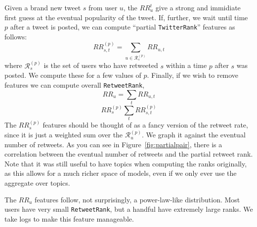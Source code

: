 Given a brand new tweet $s$ from user $u$, the $RR_u^t$ give a strong and immidiate first guess at the eventual popularity of the tweet.  If, further, we wait until time $p$ after a tweet is posted, we can compute ``partial \texttt{TwitterRank}'' features as follows:
\[RR_{s,t}^{(p)} = \sum_{u\in\mathcal{R}_s^{(p)}}RR_{u,t}\]
where $\mathcal{R}_s^{(p)}$ is the set of users who have retweeted $s$ within a time $p$ after $s$ was posted.  
We compute these for a few values of $p$.
Finally, if we wish to remove features we can compute overall \texttt{RetweetRank},
\[RR_{u} =\sum_t RR_{u,t}\]
\[RR_{s}^{(p)} \sum_t RR_{s,t}^{(p)}\]
The $RR_s^{(p)}$ features should be thought of as a fancy version of the retweet rate, since it is just a weighted sum over the $\mathcal{R}_u^{(p)}$.  We graph it against the eventual number of retweets.  As you can see in Figure~\ref{fig:partialpair}, there is a correlation between the eventual number of retweets and the partial retweet rank.  
Note that it was still useful to have topics when computing the ranks originally, as this allows for a much richer space of models, even if we only ever use the aggregate over topics.    



The $RR_{u}$ features follow, not surprisingly, a power-law-like distribution.
Most users have very small \texttt{RetweetRank}, but a handful have extremely large ranks.  
We take logs to make this feature manageable.  

\label{sec:rtrfeatues}
